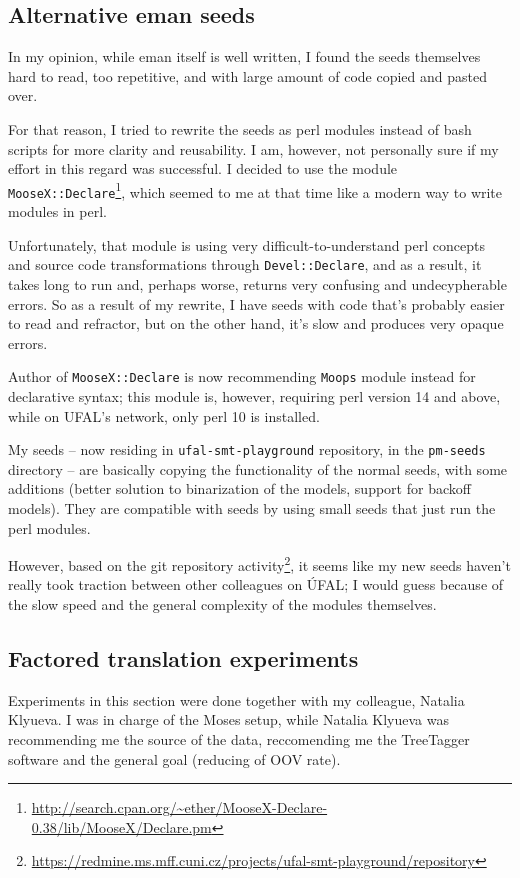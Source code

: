 \subsection{Alternative eman seeds}

In my opinion, while eman itself is well written, I found the seeds themselves hard to read, too repetitive, and with large amount of code copied and pasted over. 

For that reason, I tried to rewrite the seeds as perl modules instead of bash scripts for more clarity and reusability. I am, however, not personally sure if my effort in this regard was successful. I decided to use the module \texttt{MooseX::Declare}\footnote{\url{http://search.cpan.org/~ether/MooseX-Declare-0.38/lib/MooseX/Declare.pm}}, which seemed to me at that time like a modern way to write modules in perl. 

Unfortunately, that module is using very difficult-to-understand perl concepts and source code transformations through \texttt{Devel::Declare}, and as a result, it takes long to run and, perhaps worse, returns very confusing and undecypherable errors. 
So as a result of my rewrite, I have seeds with code that's probably easier to read and refractor, but on the other hand, it's slow and produces very opaque errors.

Author of \texttt{MooseX::Declare} is now recommending \texttt{Moops} module instead for declarative syntax; this module is, however, requiring perl version 14 and above, while on UFAL's network, only perl 10 is installed.

My  seeds -- now residing in \texttt{ufal-smt-playground} repository, in the \texttt{pm-seeds} directory -- are basically copying the functionality of the normal seeds, with some additions (better solution to binarization of the models, support for backoff models). They are compatible with  seeds by using small  seeds that just run the perl modules.

However, based on the git repository activity\footnote{\url{https://redmine.ms.mff.cuni.cz/projects/ufal-smt-playground/repository}}, it seems like my new seeds haven't really took traction between other colleagues on ÚFAL; I would guess because of the slow speed and the general complexity of the modules themselves.

\subsection{Factored translation experiments}
\label{factors}
Experiments in this section were done together with my colleague, Natalia Klyueva. I was in charge of the Moses setup, while Natalia 
Klyueva was recommending me the source of the data, 
reccomending me the TreeTagger software
and the general goal (reducing of OOV rate).

